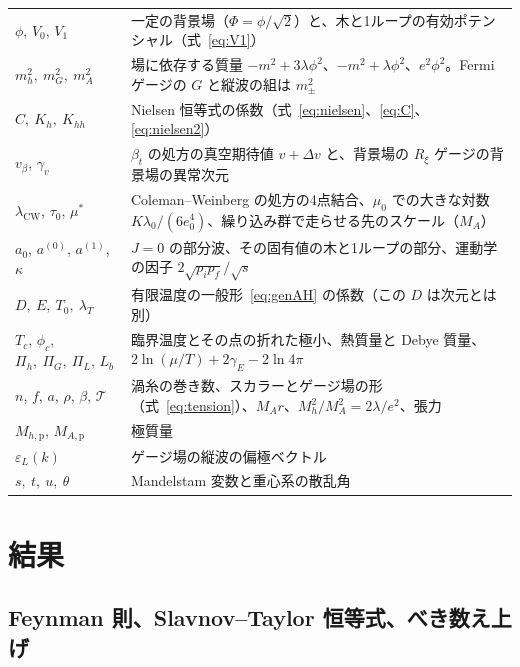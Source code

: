 \documentclass[a4paper,10pt]{ltjsarticle}
\begin{document}
\begin{table}[tbp]
\begin{tabularx}{\linewidth}{>{\raggedright\arraybackslash}p{4.5cm}X}
$\phi$, $V_0$, $V_1$ & 一定の背景場（$\Phi=\phi/\sqrt2$）と、木と1ループの有効ポテンシャル（式~\eqref{eq:V1}） \\
$m_h^2,\ m_G^2,\ m_A^2$ & 場に依存する質量 $-m^2+3\lambda\phi^2$、$-m^2+\lambda\phi^2$、$e^2\phi^2$。Fermi ゲージの $G$ と縦波の組は $m_\pm^2$ \\
$C,\ K_h,\ K_{hh}$ & Nielsen 恒等式の係数（式~\eqref{eq:nielsen}、\eqref{eq:C}、\eqref{eq:nielsen2}） \\
$v_\beta$, $\gamma_v$ & $\beta_t$ の処方の真空期待値 $v+\Delta v$ と、背景場の $R_\xi$ ゲージの背景場の異常次元 \\
$\lambda_{\mathrm{CW}}$, $\tau_0$, $\mu^*$ & Coleman--Weinberg の処方の4点結合、$\mu_0$ での大きな対数 $K\lambda_0/(6e_0^4)$、繰り込み群で走らせる先のスケール（$M_A$） \\
$a_0$, $a^{(0)}$, $a^{(1)}$, $\kappa$ & $J=0$ の部分波、その固有値の木と1ループの部分、運動学の因子 $2\sqrt{p_ip_f}/\sqrt s$ \\
$D,\ E,\ T_0,\ \lambda_T$ & 有限温度の一般形~\eqref{eq:genAH} の係数（この $D$ は次元とは別） \\
$T_c$, $\phi_c$, $\Pi_h,\ \Pi_G,\ \Pi_L$, $L_b$ & 臨界温度とその点の折れた極小、熱質量と Debye 質量、$2\ln(\mu/T)+2\gamma_E-2\ln4\pi$ \\
$n$, $f$, $a$, $\rho$, $\beta$, $\mathcal T$ & 渦糸の巻き数、スカラーとゲージ場の形（式~\eqref{eq:tension}）、$M_Ar$、$M_h^2/M_A^2=2\lambda/e^2$、張力 \\
$M_{h,\mathrm p}$, $M_{A,\mathrm p}$ & 極質量 \\
$\varepsilon_L(k)$ & ゲージ場の縦波の偏極ベクトル \\
$s,\ t,\ u,\ \theta$ & Mandelstam 変数と重心系の散乱角 \\
\bottomrule
\end{tabularx}
\end{table}

\section{結果}\label{sec:results}

\subsection{Feynman 則、Slavnov--Taylor 恒等式、べき数え上げ}\label{sec:rules}
\end{document}
